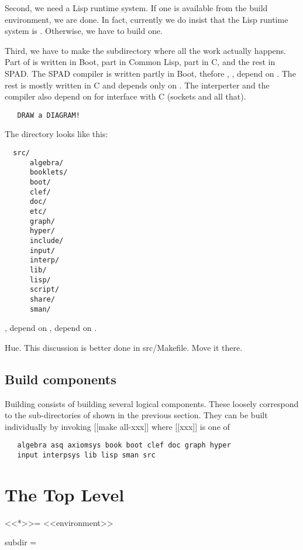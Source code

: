 \documentclass{article}
\begin{document}
Second, we need a Lisp runtime system.  If one is available from
the build environment, we are done.  In fact, currently we do insist that
the Lisp runtime system is .  Otherwise, we have to build one.

Third, we have to make the subdirectory  where all the
work actually happens.  Part of  is written in Boot, part
in Common Lisp, part in C, and the rest in SPAD.  The SPAD compiler
is written partly in Boot, thefore ,
,  depend on .  The rest
is mostly written in C and depends only on .  The
interperter and the compiler also depend on  for interface
with C (sockets and all that).
\begin{verbatim}
   DRAW a DIAGRAM!
\end{verbatim}

The  directory looks like this:
\begin{verbatim}
  src/
      algebra/
      booklets/
      boot/
      clef/
      doc/
      etc/
      graph/
      hyper/
      include/
      input/
      interp/
      lib/
      lisp/
      script/
      share/
      sman/
\end{verbatim}

,  depend on ,
 depend on .

Hue. This discussion is better done in src/Makefile.  Move it there.

\subsection{Build components}

Building  consists of building several logical components.
These loosely correspond to the sub-directories of  shown in
the previous section.  They can be built individually by invoking
[[make all-xxx]] where [[xxx]] is one of
\begin{verbatim}
   algebra asq axiomsys book boot clef doc graph hyper
   input interpsys lib lisp sman src
\end{verbatim}

\section{The Top Level }
<<*>>=
<<environment>>

subdir =
\end{document}
